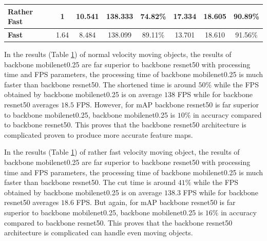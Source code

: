 \begin{table}[pt]
{\begin{tabular}{|l|c|c|c|c|c|c|c|}
    \hline
    \textbf{Rather Fast}                                     & 1                                                                                        & 10.541                                                                                        & 138.333                                                             & 74.82\%                                                             & 17.334                                                                                        & 18.605                                                              & 90.89\%                                                              \\ 
    \hline
    \textbf{Fast}                                            & 1.64                                                                                     & 8.484                                                                                         & 138.099                                                             & 89.11\%                                                             & 13.701                                                                                        & 18.610                                                              & 91.56\%                                                              \\
    \hline
    \end{tabular}}
  \label{table:pendeteksianberdasarkankecepatanobject}
\end{table}

In the results (Table \ref{table:pendeteksianberdasarkankecepatanobject}) of normal velocity moving objects, the results of backbone mobilenet0.25 are far superior to 
backbone resnet50 with processing time and FPS parameters, the processing time of backbone mobilenet0.25 
is much faster than backbone resnet50. 
The shortened time is around $50\%$ while the FPS obtained by backbone mobilenet0.25 is on average $138$ FPS while for 
backbone resnet50 averages $18.5$ FPS. However, for mAP backbone resnet50 is far superior to 
backbone mobilenet0.25, backbone mobilenet0.25 is $10\%$ in accuracy compared to backbone resnet50. 
This proves that the backbone resnet50 architecture is complicated
proven to produce more accurate feature maps.

In the results (Table \ref{table:pendeteksianberdasarkankecepatanobject}) of rather fast velocity moving object, 
the results of backbone mobilenet0.25 are far superior to backbone resnet50 
with processing time and FPS parameters, the processing time of backbone mobilenet0.25 
is much faster than backbone resnet50. 
The cut time is around $41\%$ while the FPS obtained by 
backbone mobilenet0.25 is on average $138.3$ FPS while for 
backbone resnet50 averages $18.6$ FPS. But again, for mAP 
backbone resnet50 is far superior to backbone mobilenet0.25, backbone mobilenet0.25
is $16\%$ in accuracy compared to backbone resnet50. This proves that the backbone resnet50 
architecture is complicated can handle even moving objects.

